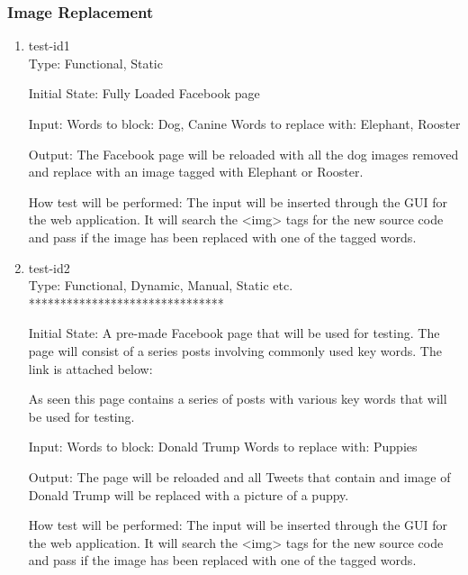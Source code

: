 \documentclass[12pt, titlepage]{article}
\begin{document}
\subsubsection{Image Replacement}
\begin{enumerate}
\item{test-id1\\}
Type: Functional, Static
					
Initial State: Fully Loaded Facebook page
					
Input: Words to block: Dog, Canine
Words to replace with: Elephant, Rooster
					
Output: The Facebook page will be reloaded with all the dog images removed and replace with an image tagged with Elephant or Rooster.
					
How test will be performed: The input will be inserted through the GUI for the web application. It will search the <img> %
tags for the new source code and pass if the image has been replaced with one of the tagged words. 
					
\item{test-id2\\}
Type: Functional, Dynamic, Manual, Static etc. *******************************
					
Initial State: A pre-made Facebook page that will be used for testing. The page will consist of  a series posts involving commonly used key words. The link is attached below:

As seen this page contains a series of posts with various key words that will be used for testing.
					
Input:  Words to block: Donald Trump
Words to replace with: Puppies
					
Output: The page will be reloaded and all Tweets that contain and image of Donald Trump will be replaced with a picture of a puppy.

How test will be performed: The input will be inserted through the GUI for the web application. It will search the <img> tags for the new source code and pass if the image has been replaced with one of the tagged words. 
\end{enumerate}
\end{document}
